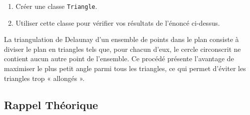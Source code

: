 \documentclass[a4paper,12pt]{article}
\theoremstyle{definition}
\begin{document}

\begin{enumerate}
  \item Créer une classe \texttt{Triangle}.
  \item Utiliser cette classe pour vérifier vos résultats de l'énoncé ci-dessus.
\end{enumerate} 


La triangulation de Delaunay d'un ensemble de points dans le plan consiste à diviser le plan en triangles tels que, pour chacun d'eux, le cercle circonscrit ne contient aucun autre point de l'ensemble. Ce procédé présente l'avantage de maximiser le plus petit angle parmi tous les triangles, ce qui permet d'éviter les triangles trop « allongés ».


\subsection{Rappel Théorique}

\end{document}
